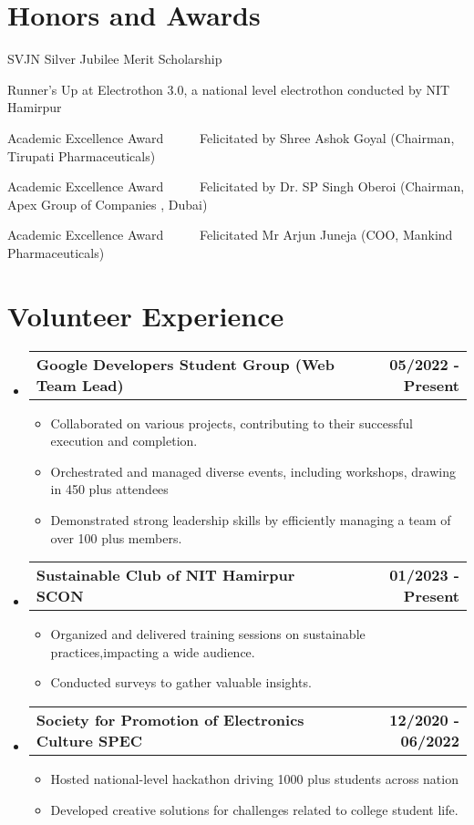 \documentclass[a4paper,20pt]{article}
\makeatletter
\newcommand{\resumeItem}[2]{
  \item\small{
    \textbf{#1}{ #2 \vspace{-2pt}}
  }
}
\newcommand{\resumeSubheadingwithout}[2]{
  \vspace{-1pt}\item
    \begin{tabular*}{0.97\textwidth}{l@{\extracolsep{\fill}}r}
      \textbf{#1} & \textbf{#2} \\
    \end{tabular*}\vspace{-5pt}
}
\newcommand{\resumeSubHeadingListStart}{\begin{itemize}[leftmargin=*,label={}]}
\newcommand{\resumeSubHeadingListEnd}{\end{itemize}}
\newcommand{\resumeItemListStart}{\begin{itemize}}
\newcommand{\resumeItemListEnd}{\end{itemize}\vspace{-5pt}}
\makeatother
\begin{document}
\section{\textbf{Honors and Awards}} \vspace{0.6em}
\begin{description}[font=$\bullet$]
\item {SVJN Silver Jubilee Merit Scholarship}
\vspace{-5pt}
\item {Runner's Up at Electrothon 3.0, a national level electrothon conducted by NIT Hamirpur}
\vspace{-5pt}
\item {Academic Excellence Award ~~~~~Felicitated by Shree Ashok Goyal (Chairman, Tirupati Pharmaceuticals) }
\vspace{-5pt}
\item {Academic Excellence Award ~~~~~Felicitated by Dr. SP Singh Oberoi
(Chairman, Apex Group of Companies , Dubai)}
\vspace{-5pt}
\item {Academic Excellence Award ~~~~~Felicitated Mr Arjun Juneja (COO, Mankind Pharmaceuticals)}
\vspace{-5pt}


\end{description}

\vspace{-0.2pt}
\section{\textbf{Volunteer Experience}} \vspace{0.6em}
  \resumeSubHeadingListStart
    \resumeSubheadingwithout{Google Developers Student Group (Web Team Lead) }{05/2022 - Present}
    \resumeItemListStart
        \resumeItem{}{Collaborated on various projects, contributing to their successful execution and completion.}
        \resumeItem{}{Orchestrated and managed diverse events, including workshops, drawing in 450 plus attendees}
        \resumeItem{}{Demonstrated strong leadership skills by efficiently managing a team of over 100 plus members.}
      \resumeItemListEnd
      \vspace{1.5pt}
    \resumeSubheadingwithout
    {Sustainable Club of NIT Hamirpur SCON}{01/2023 - Present}
    \resumeItemListStart
    
    \resumeItem{}{Organized and delivered training sessions on sustainable practices,impacting a wide audience.}
    \resumeItem{}{Conducted surveys to gather valuable insights.}
    \resumeItemListEnd
      \vspace{1.5pt}
\resumeSubheadingwithout
    {Society for Promotion of Electronics Culture SPEC}{12/2020 - 06/2022}
     \resumeItemListStart
    \resumeItem{}{Hosted national-level hackathon driving 1000 plus students across nation}
    \resumeItem{}{Developed creative solutions for challenges related to college student life.}
    \resumeItemListEnd
\vspace{5pt}
   

\resumeSubHeadingListEnd
\end{document}
